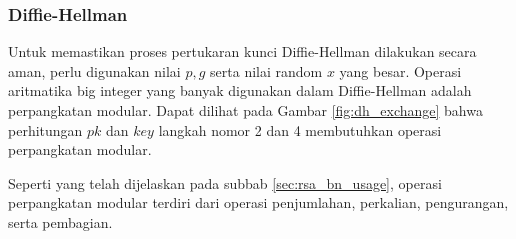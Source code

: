    \subsubsection{Diffie-Hellman}
      Untuk memastikan proses pertukaran kunci Diffie-Hellman dilakukan secara aman, perlu digunakan nilai $p, g$ serta nilai random $x$ yang besar. Operasi aritmatika big integer yang banyak digunakan dalam Diffie-Hellman adalah perpangkatan modular. Dapat dilihat pada Gambar \ref{fig:dh_exchange} bahwa perhitungan $pk$ dan $key$ langkah nomor 2 dan 4 membutuhkan operasi perpangkatan modular.

      Seperti yang telah dijelaskan pada subbab \ref{sec:rsa_bn_usage}, operasi perpangkatan modular terdiri dari operasi penjumlahan, perkalian, pengurangan, serta pembagian.
